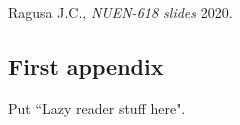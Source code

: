 \documentclass[11pt,letterpaper,notitlepage]{article}
\numberwithin{equation}{section}
\begin{document}
\newpage
\begin{thebibliography}{1}
	
	 Ragusa J.C., {\em NUEN-618 slides} 2020.
	   
\end{thebibliography}

\newpage
\begin{appendices}
\section{First appendix}
Put ``Lazy reader stuff here".
\end{appendices}
\end{document}
